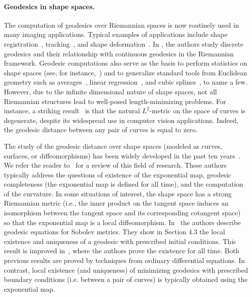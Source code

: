 \paragraph{Geodesics in shape spaces.}

The computation of geodesics over Riemannian spaces is now routinely used in many imaging applications. Typical examples of applications include shape registration~\cite{Mennucci-filtering,Younes-04,2010.03.20}, tracking~\cite{Mennucci-filtering}, and shape deformation~\cite{Kilian-shape-space}. In \cite{Rumpf}, the authors study  discrete geodesics and their relationship with continuous geodesics in the Riemannian framework.  Geodesic computations also serve as the basis to perform statistics on shape spaces (see, for instance,~\cite{Younes-04,Arsigny06}) and to generalize standard tools from Euclidean geometry such as averages~\cite{Arsigny:Siam:07}, linear regression~\cite{Niethammer_GeodReg}, and cubic splines~\cite{2010.03.20}, to name a few.  
% 
However, due to the infinite dimensional nature of shape spaces, not all Riemannian structures lead to well-posed length-minimizing problems. For instance, a striking result~\cite{MaMi,Yezzi-Menn-2005b,Yezzi-Menn-2005a} is that the natural $L^2$-metric on the space of curves is degenerate, despite its widespread use in computer vision applications. Indeed, the geodesic distance between any pair of curves is equal to zero. 

The study of the geodesic distance over shape spaces (modeled as curves, surfaces, or diffeomorphisms) has been widely developed in the past ten years~\cite{MR3132089,MR3080480,MR3011892}. We refer the reader to~\cite{2013arXiv1305.1150B} for a review of this field of research. These authors typically address the questions of existence of the exponential map, geodesic completeness (the exponential map is defined for all time), and  the computation of the curvature. In some situations of interest, the shape space has a strong Riemannian metric (i.e., the  inner product on the tangent space induces an isomorphism between the tangent space and its corresponding cotangent space) so that the exponential map is a local diffeomorphism. 
%
In~\cite{MuMi_ov} the authors describe geodesic equations for Sobolev metrics. They show in Section 4.3 the local existence and uniqueness of a geodesic with prescribed initial conditions. This result is improved in~\cite{Bruveris}, where the authors prove the existence for all time. Both previous results are proved by techniques from ordinary differential equations.
% 
In contrast, local existence (and uniqueness) of minimizing geodesics with prescribed boundary conditions (i.e. between a pair of curves) is typically obtained using the exponential map. 

